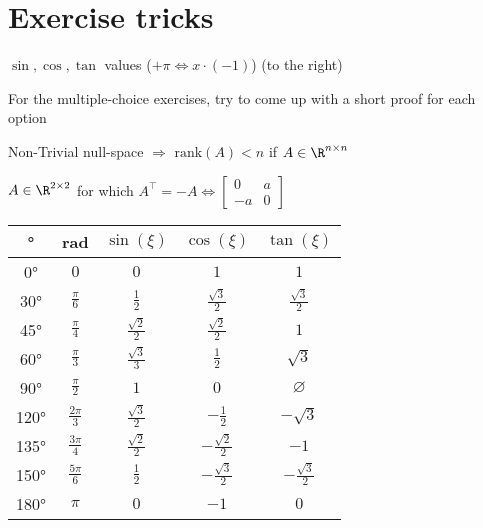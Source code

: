 \newsection
\section{Exercise tricks}

\begin{multicols}{2}
    $\sin, \cos, \tan$ values ($+\pi \Leftrightarrow x \cdot (-1)$) (to the right)

     For the multiple-choice exercises, try to come up with a short proof for each option

    Non-Trivial null-space $\Rightarrow$ $\text{rank}(A) < n$ if $A \in \R^{n \times n}$

    $A \in \R^{2 \times 2}$ for which $A^{\top} = -A \Leftrightarrow \begin{bmatrix}
            0  & a \\
            -a & 0
        \end{bmatrix}$


    \begin{tabular}[h!]{|c|c|c|c|c|}
        \hline
        \rowcolor{Aquamarine} ° & rad              & $\sin(\xi)$          & $\cos(\xi)$           & $\tan(\xi)$           \\
        \hline
        0°                      & $0$              & $0$                  & $1$                   & $1$                   \\
        \hline
        30°                     & $\frac{\pi}{6}$  & $\frac{1}{2}$        & $\frac{\sqrt{3}}{2}$  & $\frac{\sqrt{3}}{2}$  \\
        \hline
        45°                     & $\frac{\pi}{4}$  & $\frac{\sqrt{2}}{2}$ & $\frac{\sqrt{2}}{2}$  & $1$                   \\
        \hline
        60°                     & $\frac{\pi}{3}$  & $\frac{\sqrt{3}}{3}$ & $\frac{1}{2}$         & $\sqrt{3}$            \\
        \hline
        90°                     & $\frac{\pi}{2}$  & $1$                  & $0$                   & $\varnothing$         \\
        \hline
        120°                    & $\frac{2\pi}{3}$ & $\frac{\sqrt{3}}{2}$ & $-\frac{1}{2}$        & $-\sqrt{3}$           \\
        \hline
        135°                    & $\frac{3\pi}{4}$ & $\frac{\sqrt{2}}{2}$ & $-\frac{\sqrt{2}}{2}$ & $-1$                  \\
        \hline
        150°                    & $\frac{5\pi}{6}$ & $\frac{1}{2}$        & $-\frac{\sqrt{3}}{2}$ & $-\frac{\sqrt{3}}{2}$ \\
        \hline
        180°                    & $\pi$            & $0$                  & $-1$                  & $0$                   \\
        \hline
    \end{tabular}
\end{multicols}


